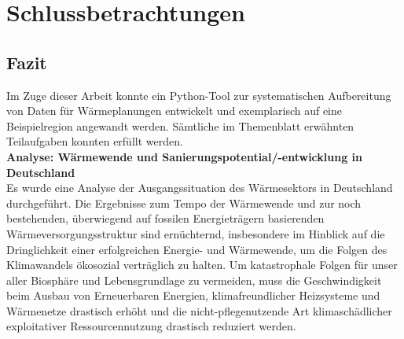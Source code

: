 
\chapter{Schlussbetrachtungen}
	\section{Fazit}
		
	
		
		
		
	
		Im Zuge dieser Arbeit konnte ein Python-Tool zur systematischen Aufbereitung von Daten für Wärmeplanungen entwickelt und exemplarisch auf eine Beispielregion angewandt werden. Sämtliche im Themenblatt erwähnten Teilaufgaben konnten erfüllt werden. \\
		
		\textbf{Analyse: Wärmewende und Sanierungspotential/-entwicklung in Deutschland}\\
		Es wurde eine Analyse der Ausgangssituation des Wärmesektors in Deutschland durchgeführt. Die Ergebnisse zum Tempo der Wärmewende und zur noch bestehenden, überwiegend auf fossilen Energieträgern basierenden Wärmeversorgungsstruktur sind ernüchternd, insbesondere im Hinblick auf die Dringlichkeit einer erfolgreichen Energie- und Wärmewende, um die Folgen des Klimawandels ökosozial verträglich zu halten. Um katastrophale Folgen für unser aller Biosphäre und Lebensgrundlage zu vermeiden, muss die Geschwindigkeit beim Ausbau von Erneuerbaren Energien, klimafreundlicher Heizsysteme und Wärmenetze drastisch erhöht und die nicht-pflegenutzende Art klimaschädlicher exploitativer Ressourcennutzung drastisch reduziert werden. 
		
